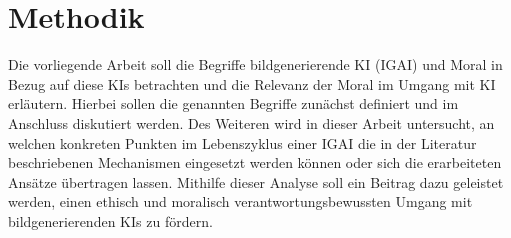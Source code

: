 \section{Methodik}
Die vorliegende Arbeit soll die Begriffe bildgenerierende KI (IGAI) und Moral in Bezug auf diese KIs betrachten und 
die Relevanz der Moral im Umgang mit KI erläutern. Hierbei sollen die genannten Begriffe zunächst definiert und im 
Anschluss diskutiert werden. Des Weiteren wird in dieser Arbeit untersucht, an welchen konkreten Punkten im Lebenszyklus 
einer IGAI die in der Literatur beschriebenen Mechanismen eingesetzt werden können oder sich die erarbeiteten Ansätze übertragen 
lassen. Mithilfe dieser Analyse soll ein Beitrag dazu geleistet werden, einen ethisch und moralisch verantwortungsbewussten 
Umgang mit bildgenerierenden KIs zu fördern.